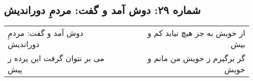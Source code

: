 \begin{center}
\section*{شماره ۲۹: دوش آمد و گفت: مردمِ دوراندیش}
\label{sec:029}
\begin{longtable}{l p{0.5cm} r}
دوش آمد و گفت: مردمِ دوراندیش
&&
از خویش به جز هیچ نیابد کم و بیش
\\
می بر نتوان گرفت این پرده ز پیش
&&
گر برگیرم ز خویش من مانم و خویش
\\
\end{longtable}
\end{center}
